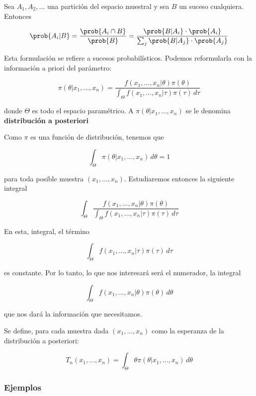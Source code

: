 \documentclass{apuntes}
\begin{document}
\begin{theorem} Sea $A_1,A_2,\dotsc$ una partición del espacio muestral y sea $B$ un suceso cualquiera. Entonces

\[ \prob{A_i|B} = \frac{\prob{A_i\cap B}}{\prob{B}} = \frac{\prob{B|A_i}\cdot \prob{A_i}}{\sum_j \prob{B|A_j}\cdot \prob{A_j}} \]

Esta formulación se refiere a sucesos probabilísticos. Podemos reformularla con la información a priori del parámetro:

\begin{equation}
\label{eqBayes}
 \pi(\theta | x_1,\dotsc,x_n) = \frac{f(x_1,\dotsc,x_n|\theta)\pi(\theta)}{\displaystyle \int_\Theta f(x_1,\dotsc,x_n|\tau)\pi(\tau)\,d\tau} 
 \end{equation}

donde $\Theta$ es todo el espacio paramétrico. A $ \pi(\theta | x_1,\dotsc,x_n) $ se le denomina \textbf{distribución a posteriori}
\end{theorem}

Como $\pi$ es una función de distribución, tenemos que 

\[ \int_\Theta \pi(\theta|x_1,\dotsc,x_n)\,d\theta = 1 \]

para toda posible muestra $(x_1,\dotsc,x_n)$. Estudiaremos entonces la siguiente integral

\[ \int_\Theta \frac{f(x_1,\dotsc,x_n|\theta)\pi(\theta)}{\displaystyle \int_\Theta f(x_1,\dotsc,x_n|\tau)\pi(\tau)\,d\tau} \]

En esta, integral, el término 

\[ \int_\Theta f(x_1,\dotsc,x_n|\tau)\pi(\tau)\,d\tau \] 

es constante. Por lo tanto, lo que nos interesará será el numerador, la integral 

\[ \int_\Theta f(x_1,\dotsc,x_n|\theta)\pi(\theta)\,d\theta \] 

que nos dará la información que necesitamos.

\begin{defn} Se define, para cada muestra dada $(x_1,\dotsc,x_n)$ como la esperanza de la distribución a posteriori:

\[ T_n(x_1,\dotsc,x_n) = \int_\Theta \theta\pi(\theta|x_1,\dotsc,x_n)\,d\theta \]
\end{defn}


\subsubsection{Ejemplos}
\end{document}
